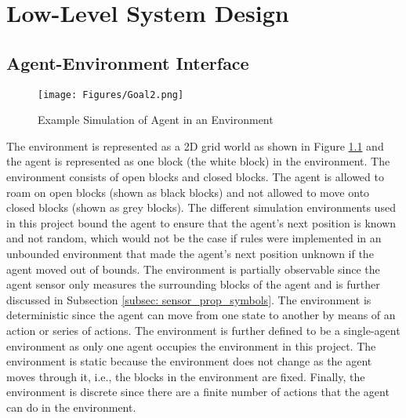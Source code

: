 






\chapter{Low-Level System Design} 
\label{LL_design}


\section{Agent-Environment Interface}

\begin{figure}[H]
    \centering
    \texttt{[image: Figures/Goal2.png]}
    \caption{Example Simulation of Agent in an Environment} 
    \label{fig:agent_in_env_low_level}
\end{figure}


The environment is represented as a 2D grid world as shown in Figure \ref{fig:agent_in_env_low_level} and the agent is represented as one block (the white block) in the environment. The environment consists of open blocks and closed blocks. The agent is allowed to roam on open blocks (shown as black blocks) and not allowed to move onto closed blocks (shown as grey blocks). The different simulation environments used in this project bound the agent to ensure that the agent's next position is known and not random, which would not be the case if rules were implemented in an unbounded environment that made the agent's next position unknown if the agent moved out of bounds.
The environment is partially observable since the agent sensor only measures the surrounding blocks of the agent and is further discussed in Subsection \ref{subsec: sensor_prop_symbols}. The environment is deterministic since the agent can move from one state to another by means of an action or series of actions. The environment is further defined to be a single-agent environment as only one agent occupies the environment in this project. The environment is static because the environment does not change as the agent moves through it, i.e., the blocks in the environment are fixed. Finally, the environment is discrete since there are a finite number of actions that the agent can do in the environment.


